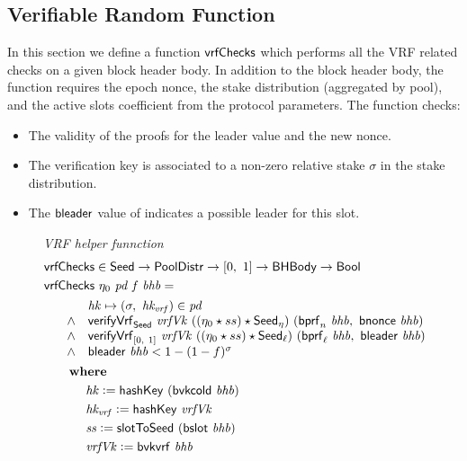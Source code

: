 \subsection{Verifiable Random Function}
\label{sec:verif-rand-funct}

In this section we define a function $\mathsf{vrfChecks}$ which performs all the VRF related checks
on a given block header body.
In addition to the block header body, the function requires the epoch nonce,
the stake distribution (aggregated by pool), and the active slots coefficient from the protocol
parameters. The function checks:

\begin{itemize}
\item The validity of the proofs for the leader value and the new nonce.
\item The verification key is associated to a non-zero relative stake
  $\sigma$ in the stake distribution.
\item The $\mathsf{bleader}$ value of  indicates a possible leader for
  this slot.
\end{itemize}

\begin{figure}
  \emph{VRF helper funnction}
  \begin{align*}
      & \mathsf{vrfChecks} \in \mathsf{Seed} \to \mathsf{PoolDistr} \to [0,~1] \to \mathsf{BHBody} \to \mathsf{Bool} \\
      & \mathsf{vrfChecks}~\eta_0~\mathit{pd}~\mathit{f}~\mathit{bhb} = \\
      & \begin{array}{cl}
        ~~~~ & \mathit{hk}\mapsto (\sigma,~\mathit{hk_{vrf}})\in\mathit{pd} \\
        ~~~~ \land &
             \mathsf{verifyVrf}_{\mathsf{Seed}} ~ \mathit{vrfVk} ~ ((\eta_0\star ss)\star\mathsf{Seed}_\eta) ~(\mathsf{bprf}_{n}~\mathit{bhb},~\mathsf{bnonce}~\mathit{bhb}) \\
        ~~~~ \land &
             \mathsf{verifyVrf}_{[0,~1]} ~ \mathit{vrfVk} ~ ((\eta_0\star ss)\star\mathsf{Seed}_\ell) ~(\mathsf{bprf}_{\ell}~\mathit{bhb},~\mathsf{bleader}~\mathit{bhb}) \\
        ~~~~ \land &
             \mathsf{bleader}~\mathit{bhb} < 1 - (1 - f)^{\sigma} \\
      \end{array} \\
      & ~~~~~ ~ \mathbf{where}~ ~  \\
      & ~~~~~~~~~~\mathit{hk} \mathrel{\mathop:}= \mathsf{hashKey}~ \mathit{(\mathsf{bvkcold}~\mathit{b}hb)} \\
      & ~~~~~~~~~~\mathit{hk_{vrf}} \mathrel{\mathop:}= \mathsf{hashKey}~ \mathit{vrfVk} \\
      & ~~~~~~~~~~\mathit{ss} \mathrel{\mathop:}= \mathsf{slotToSeed}~ \mathit{(\mathsf{bslot}~\mathit{bhb})} \\
      & ~~~~~~~~~~\mathit{vrfVk} \mathrel{\mathop:}= \mathsf{bvkvrf}~\mathit{bhb} \\
  \end{align*}
  \label{fig:vrf-checks}
\end{figure}

